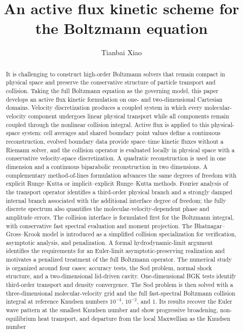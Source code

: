 \documentclass[preprint,3p,12pt]{elsarticle}
\begin{document}
\begin{frontmatter}

\title{An active flux kinetic scheme for the Boltzmann equation}

\author[imech,ucas]{Tianbai Xiao}


\begin{abstract}
It is challenging to construct high-order Boltzmann solvers that remain compact in physical space and preserve the conservative structure of particle transport and collision. Taking the full Boltzmann equation as the governing model, this paper develops an active flux kinetic formulation on one- and two-dimensional Cartesian domains. Velocity discretization produces a coupled system in which every molecular-velocity component undergoes linear physical transport while all components remain coupled through the nonlinear collision integral. Active flux is applied to this physical-space system: cell averages and shared boundary point values define a continuous reconstruction, evolved boundary data provide space--time kinetic fluxes without a Riemann solver, and the collision operator is evaluated locally in physical space with a conservative velocity-space discretization. A quadratic reconstruction is used in one dimension and a continuous biparabolic reconstruction in two dimensions. A complementary method-of-lines formulation advances the same degrees of freedom with explicit Runge--Kutta or implicit--explicit Runge--Kutta methods. Fourier analysis of the transport operator identifies a third-order physical branch and a strongly damped internal branch associated with the additional interface degree of freedom; the fully discrete spectrum also quantifies the molecular-velocity-dependent phase and amplitude errors. The collision interface is formulated first for the Boltzmann integral, with conservative fast spectral evaluation and moment projection. The Bhatnagar--Gross--Krook model is introduced as a simplified collision specialization for verification, asymptotic analysis, and penalization. A formal hydrodynamic-limit argument identifies the requirements for an Euler-limit asymptotic-preserving realization and motivates a penalized treatment of the full Boltzmann operator. The numerical study is organized around four cases: accuracy tests, the Sod problem, normal shock structure, and a two-dimensional lid-driven cavity. One-dimensional BGK tests identify third-order transport and density convergence. The Sod problem is then solved with a three-dimensional molecular-velocity grid and the full fast-spectral Boltzmann collision integral at reference Knudsen numbers $10^{-4}$, $10^{-2}$, and $1$. Its results recover the Euler wave pattern at the smallest Knudsen number and show progressive broadening, non-equilibrium heat transport, and departure from the local Maxwellian as the Knudsen number 
\end{abstract}
\end{frontmatter}
\end{document}
